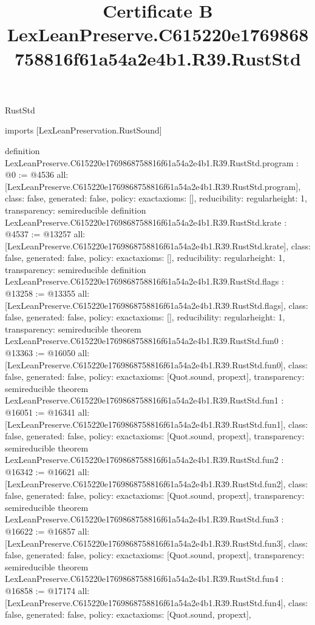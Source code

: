\begin{lexlean}{RustStd}
\title{Certificate B LexLeanPreserve.C615220e1769868758816f61a54a2e4b1.R39.RustStd}
\begin{coremodule}
imports [LexLeanPreservation.RustSound]

definition LexLeanPreserve.C615220e1769868758816f61a54a2e4b1.R39.RustStd.program : @0 := @4536 {
  all: [LexLeanPreserve.C615220e1769868758816f61a54a2e4b1.R39.RustStd.program],
  class: false,
  generated: false,
  policy: exact{axioms: []},
  reducibility: regular{height: 1},
  transparency: semireducible
}
definition LexLeanPreserve.C615220e1769868758816f61a54a2e4b1.R39.RustStd.krate : @4537 := @13257 {
  all: [LexLeanPreserve.C615220e1769868758816f61a54a2e4b1.R39.RustStd.krate],
  class: false,
  generated: false,
  policy: exact{axioms: []},
  reducibility: regular{height: 1},
  transparency: semireducible
}
definition LexLeanPreserve.C615220e1769868758816f61a54a2e4b1.R39.RustStd.flags : @13258 := @13355 {
  all: [LexLeanPreserve.C615220e1769868758816f61a54a2e4b1.R39.RustStd.flags],
  class: false,
  generated: false,
  policy: exact{axioms: []},
  reducibility: regular{height: 1},
  transparency: semireducible
}
theorem LexLeanPreserve.C615220e1769868758816f61a54a2e4b1.R39.RustStd.fun0 : @13363 := @16050 {
  all: [LexLeanPreserve.C615220e1769868758816f61a54a2e4b1.R39.RustStd.fun0],
  class: false,
  generated: false,
  policy: exact{axioms: [Quot.sound, propext]},
  transparency: semireducible
}
theorem LexLeanPreserve.C615220e1769868758816f61a54a2e4b1.R39.RustStd.fun1 : @16051 := @16341 {
  all: [LexLeanPreserve.C615220e1769868758816f61a54a2e4b1.R39.RustStd.fun1],
  class: false,
  generated: false,
  policy: exact{axioms: [Quot.sound, propext]},
  transparency: semireducible
}
theorem LexLeanPreserve.C615220e1769868758816f61a54a2e4b1.R39.RustStd.fun2 : @16342 := @16621 {
  all: [LexLeanPreserve.C615220e1769868758816f61a54a2e4b1.R39.RustStd.fun2],
  class: false,
  generated: false,
  policy: exact{axioms: [Quot.sound, propext]},
  transparency: semireducible
}
theorem LexLeanPreserve.C615220e1769868758816f61a54a2e4b1.R39.RustStd.fun3 : @16622 := @16857 {
  all: [LexLeanPreserve.C615220e1769868758816f61a54a2e4b1.R39.RustStd.fun3],
  class: false,
  generated: false,
  policy: exact{axioms: [Quot.sound, propext]},
  transparency: semireducible
}
theorem LexLeanPreserve.C615220e1769868758816f61a54a2e4b1.R39.RustStd.fun4 : @16858 := @17174 {
  all: [LexLeanPreserve.C615220e1769868758816f61a54a2e4b1.R39.RustStd.fun4],
  class: false,
  generated: false,
  policy: exact{axioms: [Quot.sound, propext]},
}
\end{coremodule}
\end{lexlean}

